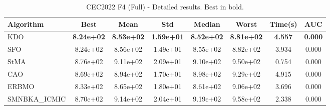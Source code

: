 \begin{table}[H]
\centering\small
\caption{CEC2022 F4 (Full) - Detailed results. Best in bold.}
\label{tab:cec2022_F4}
\begin{tabular}{lccccccc}
\toprule
\textbf{Algorithm} & \textbf{Best} & \textbf{Mean} & \textbf{Std} & \textbf{Median} & \textbf{Worst} & \textbf{Time(s)} & \textbf{AUC} \\
\midrule
KDO & \textbf{8.24e+02} & \textbf{8.53e+02} & \textbf{1.59e+01} & \textbf{8.52e+02} & \textbf{8.81e+02} & \textbf{4.557} & \textbf{0.000} \\
SFO & 8.24e+02 & 8.56e+02 & 1.49e+01 & 8.55e+02 & 8.82e+02 & 3.934 & 0.000 \\
StMA & 8.76e+02 & 9.11e+02 & 2.09e+01 & 9.10e+02 & 9.50e+02 & 0.754 & 0.000 \\
CAO & 8.69e+02 & 8.94e+02 & 1.70e+01 & 8.98e+02 & 9.29e+02 & 4.915 & 0.000 \\
ERBMO & 8.33e+02 & 8.65e+02 & 1.80e+01 & 8.61e+02 & 9.06e+02 & 3.696 & 0.000 \\
SMNBKA_ICMIC & 8.70e+02 & 9.14e+02 & 2.04e+01 & 9.19e+02 & 9.58e+02 & 2.338 & 0.000 \\
\bottomrule
\end{tabular}
\end{table}
